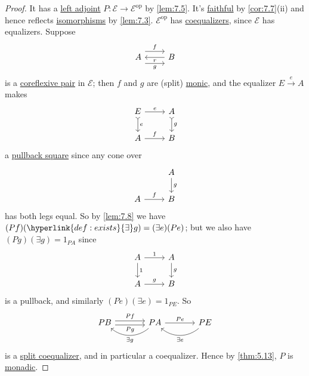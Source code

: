 \documentclass{article}
\begin{document}
\begin{proof}
  It has a \hyperlink{def:adj}{left adjoint} $P: \mathscr{E} \to \mathscr{E}^{\text{op}}$ by \cref{lem:7.5}.
  It's \hyperlink{def:full}{faithful} by \cref{cor:7.7}(ii) and hence reflects \hyperlink{def:iso}{isomorphisms} by \cref{lem:7.3}.
  $\mathscr{E}^\text{op}$ has \hyperlink{def:equalizer}{coequalizers}, since $\mathscr{E}$ has equalizers.
  Suppose
  \begin{equation*}
    \begin{tikzcd}
    A \rar[shift left=3]{f} \rar[shift right=3,']{g} & B \lar{r}
    \end{tikzcd}
  \end{equation*}
  is a \hyperlink{def:reflexive}{coreflexive pair} in $\mathscr{E}$; then $f$ and $g$ are (split) \hyperlink{def:monic}{monic}, and the equalizer $E \xrightarrow{e} A$ makes
  \begin{equation*}
  \begin{tikzcd}
    E \rar{e} \dar[tail]{e} & A \dar[tail]{g} \\ A \rar{f} & B
  \end{tikzcd}
  \end{equation*}
  a \hyperlink{def:pullback}{pullback square} since any cone over
  \begin{equation*}
    \begin{tikzcd}
      &A \dar{g} \\ A \rar{f} & B
    \end{tikzcd}
  \end{equation*}
  has both legs equal.
  So by \cref{lem:7.8} we have $(Pf)(\hyperlink{def:exists}{\exists} g) = (\exists e)(Pe)$; but we also have $(Pg)(\exists g) = 1_{PA}$ since
  \begin{equation*}
  \begin{tikzcd}
    A \rar{1} \dar{1} & A \dar{g} \\
    A \rar{g} & B
  \end{tikzcd}
  \end{equation*}
  is a pullback, and similarly $(Pe)(\exists e) = 1_{PE}$.
  So
  \begin{equation*}
    \begin{tikzcd}[sep=large]
    PB \rar[shift left]{Pf} \rar[shift right,']{Pg} & PA \lar[bend left=40]{\exists g} \rar{Pe} & PE \lar[bend left=40]{\exists e}
  \end{tikzcd}
  \end{equation*}
  is a \hyperlink{def:splitcoeq}{split coequalizer}, and in particular a coequalizer.
  Hence by \cref{thm:5.13}, $P$ is \hyperlink{def:monadic}{monadic}.
\end{proof}
\end{document}
